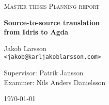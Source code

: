 \documentclass[parskip=half]{scrartcl}
\begin{document}
\begin{titlepage}

\centering
{\scshape\LARGE Master thesis Planning report}


\vspace{0.5cm}
{\huge\bfseries Source-to-source translation\\ from Idris to Agda
  }

\vspace{2cm}
{\Large Jakob Larsson\\}
\texttt{<jakob@karljakoblarsson.com>}

\vspace{1.0cm}
{\large Supervisor: Patrik Jansson  \\
        Examiner: Nils Anders Danielsson}

\vspace{1.5cm}

\vfill
{\large \today}

\end{titlepage}






\end{document}
